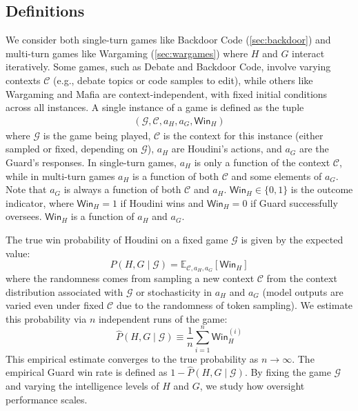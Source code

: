 \documentclass{article}
\begin{document}
\subsection{Definitions}
\label{sec:app_def}
We consider both single-turn games like Backdoor Code (\cref{sec:backdoor}) and multi-turn games like Wargaming (\cref{sec:wargames}) where $H$ and $G$ interact iteratively. Some games, such as Debate and Backdoor Code, involve varying contexts $\mathcal{C}$ (e.g., debate topics or code samples to edit), while others like Wargaming and Mafia are context-independent, with fixed initial conditions across all instances. A single instance of a game is defined as the tuple
\begin{align}
(\mathcal{G}, \mathcal{C}, a_H, a_G, \mathsf{Win}_H)
\end{align}
where
$\mathcal{G}$ is the game being played,
$\mathcal{C}$ is the context for this instance (either sampled or fixed, depending on $\mathcal{G}$),
$a_H$ are Houdini’s actions, and
$a_G$ are the Guard’s responses. In single-turn games, $a_H$ is only a function of the context $\mathcal{C}$, while in multi-turn games $a_H$ is a function of both $\mathcal{C}$ and some elements of $a_G$. Note that $a_G$ is always a function of both $\mathcal{C}$ and $a_H$. $\mathsf{Win}_H \in \{0,1\}$ is the outcome indicator, where $\mathsf{Win}_H = 1$ if Houdini wins and $\mathsf{Win}_H = 0$ if Guard successfully oversees.  $\mathsf{Win}_H$ is a function of $a_H$ and $a_G$. 

The true win probability of Houdini on a fixed game $\mathcal{G}$ is given by the expected value:
\begin{equation}
    P(H, G \mid \mathcal{G}) = \mathbb{E}_{\mathcal{C}, a_H, a_G}[\mathsf{Win}_H]
\end{equation}
where the randomness comes from sampling a new context $\mathcal{C}$ from the context distribution associated with $\mathcal{G}$ or stochasticity in $a_H$ and $a_G$ (model outputs are varied even under fixed $\mathcal{C}$ due to the randomness of token sampling). We estimate this probability via $n$ independent runs of the game:
\begin{equation}
    \hat{P}(H, G \mid \mathcal{G}) \equiv \frac{1}{n} \sum_{i=1}^n \mathsf{Win}_H^{(i)}
\end{equation}
This empirical estimate converges to the true probability as $n \to \infty$. The empirical Guard win rate is defined as $1 - \hat{P}(H, G \mid \mathcal{G})$. 
By fixing the game $\mathcal{G}$ and varying the intelligence levels of $H$ and $G$, we study how oversight performance scales.
\end{document}
